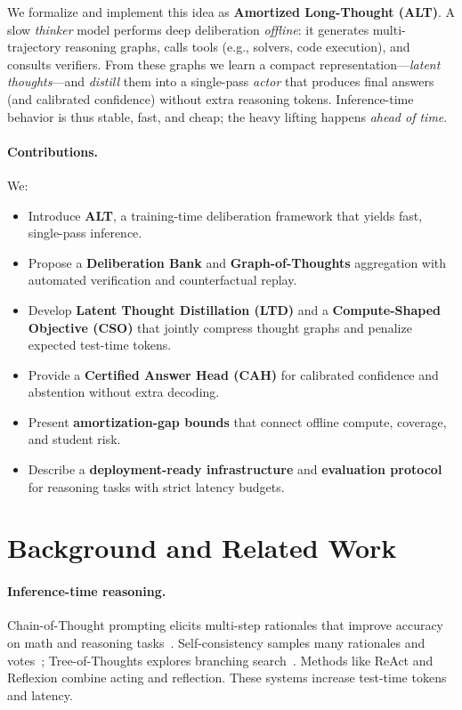 \documentclass[11pt]{article}
\newcommand{\1}{\mathbf{1}}
\begin{document}
We formalize and implement this idea as \textbf{Amortized Long-Thought (ALT)}. A slow \emph{thinker} model performs deep deliberation \emph{offline}: it generates multi-trajectory reasoning graphs, calls tools (e.g., solvers, code execution), and consults verifiers. From these graphs we learn a compact representation---\emph{latent thoughts}---and \emph{distill} them into a single-pass \emph{actor} that produces final answers (and calibrated confidence) without extra reasoning tokens. Inference-time behavior is thus stable, fast, and cheap; the heavy lifting happens \emph{ahead of time}.

\paragraph{Contributions.} We:
\begin{itemize}
  \item Introduce \textbf{ALT}, a training-time deliberation framework that yields fast, single-pass inference.
  \item Propose a \textbf{Deliberation Bank} and \textbf{Graph-of-Thoughts} aggregation with automated verification and counterfactual replay.
  \item Develop \textbf{Latent Thought Distillation (LTD)} and a \textbf{Compute-Shaped Objective (CSO)} that jointly compress thought graphs and penalize expected test-time tokens.
  \item Provide a \textbf{Certified Answer Head (CAH)} for calibrated confidence and abstention without extra decoding.
  \item Present \textbf{amortization-gap bounds} that connect offline compute, coverage, and student risk.
  \item Describe a \textbf{deployment-ready infrastructure} and \textbf{evaluation protocol} for reasoning tasks with strict latency budgets.
\end{itemize}

\section{Background and Related Work}

\paragraph{Inference-time reasoning.} Chain-of-Thought prompting elicits multi-step rationales that improve accuracy on math and reasoning tasks~\cite{wei2022chain}. Self-consistency samples many rationales and votes~\cite{wang2022selfconsistency}; Tree-of-Thoughts explores branching search~\cite{yao2023tot}. Methods like ReAct and Reflexion combine acting and reflection. These systems increase test-time tokens and latency.
\end{document}
